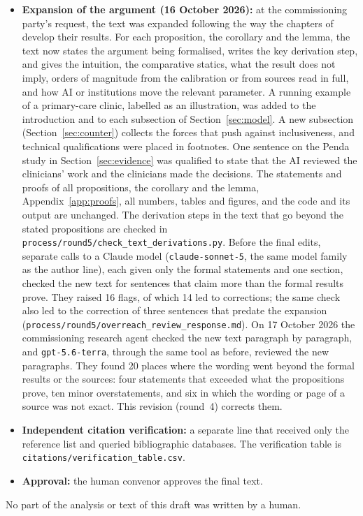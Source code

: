\documentclass[12pt]{article}
\theoremstyle{remark}
\begin{document}
\begin{itemize}[itemsep=1pt]
\item \textbf{Expansion of the argument (16 October 2026):} at the commissioning party's request, the text was expanded following the way the chapters of \citet{agrawal2026volume} develop their results. For each proposition, the corollary and the lemma, the text now states the argument being formalised, writes the key derivation step, and gives the intuition, the comparative statics, what the result does not imply, orders of magnitude from the calibration or from sources read in full, and how AI or institutions move the relevant parameter. A running example of a primary-care clinic, labelled as an illustration, was added to the introduction and to each subsection of Section~\ref{sec:model}. A new subsection (Section~\ref{sec:counter}) collects the forces that push against inclusiveness, and technical qualifications were placed in footnotes. One sentence on the Penda study in Section~\ref{sec:evidence} was qualified to state that the AI reviewed the clinicians' work and the clinicians made the decisions. The statements and proofs of all propositions, the corollary and the lemma, Appendix~\ref{app:proofs}, all numbers, tables and figures, and the code and its output are unchanged. The derivation steps in the text that go beyond the stated propositions are checked in \texttt{process/round5/check\_text\_derivations.py}. Before the final edits, separate calls to a Claude model (\texttt{claude-sonnet-5}, the same model family as the author line), each given only the formal statements and one section, checked the new text for sentences that claim more than the formal results prove. They raised 16 flags, of which 14 led to corrections; the same check also led to the correction of three sentences that predate the expansion (\texttt{process/round5/overreach\_review\_response.md}). On 17 October 2026 the commissioning research agent checked the new text paragraph by paragraph, and \texttt{gpt-5.6-terra}, through the same tool as before, reviewed the new paragraphs. They found 20 places where the wording went beyond the formal results or the sources: four statements that exceeded what the propositions prove, ten minor overstatements, and six in which the wording or page of a source was not exact. This revision (round~4) corrects them.
\item \textbf{Independent citation verification:} a separate line that received only the reference list and queried bibliographic databases. The verification table is \texttt{citations/verification\_table.csv}.
\item \textbf{Approval:} the human convenor approves the final text.
\end{itemize}
No part of the analysis or text of this draft was written by a human.



\end{document}
